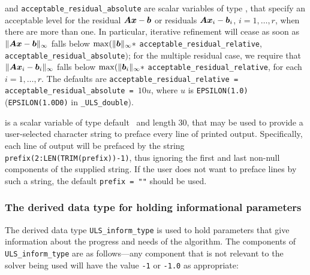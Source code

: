 \documentclass{galahad}
\newcommand{\packagename}{ULS}
\newcommand{\fullpackagename}{\libraryname\_\-\packagename}
\begin{document}
\begin{description}
  and {\tt acceptable\_residual\_absolute}
are scalar variables of type \realdp, that
specify an acceptable level for the residual ${\bm{A}} {\bm{x}} - {\bm{b}}$ or residuals
${\bm{A}} {\bm{x}}_i - {\bm{b}}_i$, $i=1,\ldots,r$,  when there are more than one.
In particular, iterative refinement will cease as soon as
$\|{\bm{A}} {\bm{x}} - {\bm{b}}\|_{\infty}$ falls below
$\max (\| {\bm{b}}\|_{\infty} \ast$ {\tt acceptable\_residual\_relative},
{\tt acceptable\_residual\_absolute}$)$;
for the multiple residual case, we require that
$\|{\bm{A}} {\bm{x}}_i - {\bm{b}}_i\|_{\infty}$ falls below
$\max (\| {\bm{b}}_i\|_{\infty} \ast$ {\tt acceptable\_residual\_relative},
for each $i=1,\ldots,r$.
The defaults are {\tt acceptable\_residual\_relative =
acceptable\_resi\-dual\_absolute = }$10 u$,
where $u$ is {\tt EPSILON(1.0)} ({\tt EPSILON(1.0D0)} in
{\tt \fullpackagename\_double}).

 is a scalar variable of type default \character\
and length 30, that may be used to provide a user-selected
character string to preface every line of printed output.
Specifically, each line of output will be prefaced by the string
{\tt prefix(2:LEN(TRIM(prefix))-1)},
thus ignoring the first and last non-null components of the
supplied string. If the user does not want to preface lines by such
a string, the default {\tt prefix = ""} should be used.

\end{description}


\subsubsection{The derived data type for holding informational
 parameters}\label{typeinform}
The derived data type
{\tt \packagename\_inform\_type}
is used to hold parameters that give information about the progress and needs
of the algorithm. The components of
{\tt \packagename\_inform\_type}
are as follows---any component that is not relevant to the solver being used
will have the value {\tt -1} or {\tt -1.0} as appropriate:
\end{document}
